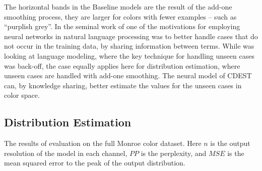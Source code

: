 \documentclass[11pt,letterpaper]{article}
\newcommand{\textcite}{\newcite}
\begin{document}
The horizontal bands in the Baseline models are the result of the add-one smoothing process, they are larger for colors with fewer examples -- such as ``purplish grey''.
In the seminal work of \textcite{NPLM} one of the motivations for employing neural networks in natural language processing was to better handle cases that do not occur in the training data, by sharing information between terms.
While \textcite{NPLM} was looking at language modeling, where the key technique for handling unseen cases was back-off, the case equally applies here for distribution estimation, where unseen cases are handled with add-one smoothing.
The neural model of CDEST can, by knowledge sharing, better estimate the values for the unseen cases in color space.
 


\subsection{Distribution Estimation}

\begin{table*}
	\centering
	\caption{\label{tblresfull} The results of evaluation on the full Monroe color dataset. Here $n$ is the output resolution of the model in each channel, $PP$ is the perplexity, and $MSE$ is the mean squared error to the peak of the output distribution.}
\end{table*}
\end{document}
